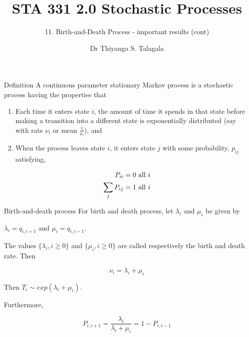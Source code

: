 \documentclass[12pt,ignorenonframetext,]{beamer}
\title[]{STA 331 2.0 Stochastic Processes}
\subtitle{11. Birth-and-Death Process - important results (cont)}
\author[
        Dr Thiyanga S. Talagala
    ]{Dr Thiyanga S. Talagala}
\institute[
    ]{
    Department of Statistics, University of Sri Jayewardenepura
    }
\date[
      
  ]{
    }
\begin{document}
  \begin{frame}[plain]
  \titlepage
  \end{frame}



\begin{frame}{Definition}
\protect\hypertarget{definition}{}
A continuous parameter stationary Markov process is a stochastic process
having the properties that

\begin{enumerate}
\item
  Each time it enters state \(i\), the amount of time it spends in that
  state before making a transition into a different state is
  exponentially distributed (say with rate \(\nu_i\) or mean
  \(\frac{1}{\nu_i}\)), and
\item
  When the process leaves state \(i\), it enters state \(j\) with some
  probability, \(p_{ij}\) satisfying,
\end{enumerate}

\begin{align*}
\tiny
P_{ii} &= 0 \text{ all } i\\
\sum_j P_{ij} &= 1 \text{ all } i \\
\end{align*}
\end{frame}

\begin{frame}{Birth-and-death process}
\protect\hypertarget{birth-and-death-process}{}
For birth and death process, let \(\lambda_i\) and \(\mu_i\) be given by

\(\lambda_i = q_{i, i+1}\) and \(\mu_i = q_{i, i-1}\).

The values \(\{\lambda_i, i\geq 0\}\) and \(\{\mu_i, i\geq 0\}\) are
called respectively the birth and death rate. Then

\[\nu_i = \lambda_i + \mu_i\]

Then \(T_i \sim exp(\lambda_i + \mu_i).\)

Furthermore,

\[P_{i, i+1}=\frac{\lambda_i}{\lambda_i + \mu_i}= 1 - P_{i, i-1}\]
\end{frame}
\end{document}
